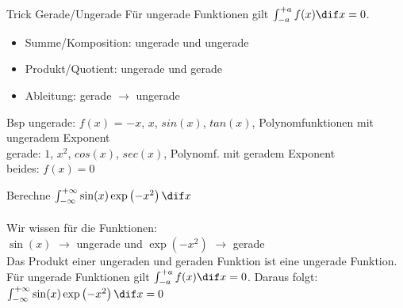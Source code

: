 \begin{KR}{Trick Gerade/Ungerade}
    Für ungerade Funktionen gilt $\int_{-a}^{+a} f(x) \dif x = 0$.
    \begin{itemize}
        \item Summe/Komposition: ungerade und ungerade
        \item Produkt/Quotient: ungerade und gerade
        \item Ableitung: gerade $\longrightarrow$ ungerade
    \end{itemize}
    Bsp ungerade: $f(x)$ = $-x$, $x$, $sin(x)$, $tan(x)$, Polynomfunktionen mit ungeradem Exponent\\
    gerade: $1$, $x^2$, $cos(x)$, $sec(x)$, Polynomf. mit geradem Exponent\\
    beides: $f(x) = 0$
\end{KR}

\begin{example}
	Berechne $\int_{-\infty}^{+\infty} \sin(x)\exp\left(-x^2\right) \dif x$\\ \\
	Wir wissen für die Funktionen:\\
        $\sin(x)$ $\to$ ungerade und $\exp(-x^2)$ $\to$ gerade\\ 
	Das Produkt einer ungeraden und geraden Funktion ist eine ungerade Funktion.\\
	Für ungerade Funktionen gilt $\int_{-a}^{+a} f(x) \dif x = 0$. Daraus folgt: 
	$\int_{-\infty}^{+\infty} \sin(x)\exp\left(-x^2\right) \dif x = 0$
\end{example}